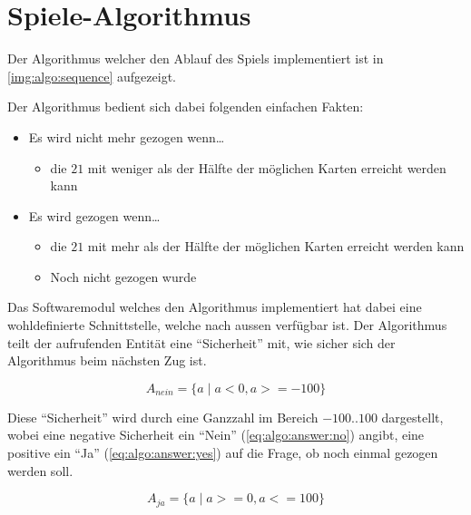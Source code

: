 \chapter{Spiele-Algorithmus}

    Der Algorithmus welcher den Ablauf des Spiels implementiert ist in
    \autoref{img:algo:sequence} aufgezeigt.

    Der Algorithmus bedient sich dabei folgenden einfachen Fakten:

    \begin{itemize}
        \item Es wird nicht mehr gezogen wenn\dots
            \begin{itemize}
                \item die $21$ mit weniger als der Hälfte der möglichen Karten
                    erreicht werden kann
            \end{itemize}
        \item Es wird gezogen wenn\dots
            \begin{itemize}
                \item die $21$ mit mehr als der Hälfte der möglichen Karten
                    erreicht werden kann
                \item Noch nicht gezogen wurde
            \end{itemize}
    \end{itemize}

    Das Softwaremodul welches den Algorithmus implementiert hat dabei eine
    wohldefinierte Schnittstelle, welche nach aussen verfügbar ist.
    Der Algorithmus teilt der aufrufenden Entität eine ``Sicherheit'' mit,
    wie sicher sich der Algorithmus beim nächsten Zug ist.

    \begin{equation}
        \label{eq:algo:answer:no}
        A_{nein} = \{ a \mid a < 0, a >= -100 \}
    \end{equation}

    Diese ``Sicherheit'' wird durch eine Ganzzahl im Bereich $-100..100$
    dargestellt, wobei eine negative Sicherheit ein ``Nein''
    (\ref{eq:algo:answer:no}) angibt, eine positive ein ``Ja''
    (\ref{eq:algo:answer:yes}) auf die Frage, ob noch einmal gezogen werden soll.

    \begin{equation}
        \label{eq:algo:answer:yes}
        A_{ja} = \{ a \mid a >= 0, a <= 100 \}
    \end{equation}

